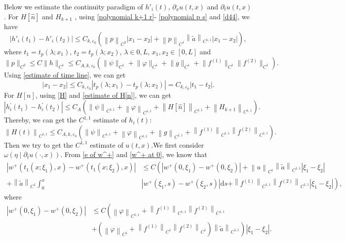 \documentclass[a4paper,reqno,11pt]{amsart}
\numberwithin{equation}{section} %
\begin{document}
Below we estimate the continuity paradigm of  $h'_i(t)$, $\partial _x u(t,x)$ and  $\partial _t u(t,x)$ .
For $ H\left[ \hat{n} \right] $ and $H_{k+1}$ , using \eqref{polynomial k+1 r}- \eqref{polynomial p s} and \eqref{d44}, we have
$$
\left| h' _i\left( t_1 \right) -h'_i\left( t_2 \right) \right|\leq C_{k,\varepsilon _0}(\left\| p \right\| _{C^2}\left| x_1-x_2 \right|+\left\| p \right\| _{C^1}\left\| \tilde{a} \right\| _{C^{1,1}}\left| x_1-x_2 \right|),
$$
where $t_1=t_p(\lambda ;x _1)$, $t_2=t_p(\lambda;x _2)$, $\lambda  \in { 0,L } $, $x _1,x _2 \in [0,L]$  and
$$
\|p\|_{C^2} \leq C\|h\|_{C^1} \leq C_{A,k,\varepsilon _0}(\lVert \psi \rVert _{C^1}+\lVert \varphi  \rVert _{C^1}+  \lVert g \rVert _{C^1}+\lVert f^{(1)} \rVert _{C^1}\lVert f^{(2)} \rVert _{C^1}) .
$$
Using \eqref{estimate of time line}, we can get
$$
\left| x_1-x_2 \right|\le C_{k,\varepsilon _0}\left| t_p\left( \lambda ;x_1 \right) -t_p\left( \lambda ;x_2 \right) \right|=C_{k,\varepsilon _0}\left| t_1-t_2 \right|.
$$
For $ H\left[ n \right] $, using \eqref{H} and \eqref{estimate of H[n]}, we can get
$$
\left| h^{\prime }_i\left( t_1 \right) -h^{\prime }_i\left( t_2 \right) \right|\leq C_A(\left\| \psi \right\| _{C^{1,1}}+\left\| \varphi \right\| _{C^{1,1}}+ \left\|H\left[ \hat{n} \right] \right\| _{C^{1,1}}+\left\|H_{k+1}\right\| _{C^{1,1}}).
$$
Thereby, we can get the $C^{1,1}$ estimate of $h_i(t) $:
$$
\left\| H(t) \right\| _{C^{1,1}}\leq C_{A,k,\varepsilon _0}(\left\| \psi \right\| _{C^{1,1}}+\left\| \varphi \right\| _{C^{1,1}}+\left\| g \right\| _{C^{1,1}}+\left\| f^{(1)} \right\| _{C^{1,1}}\left\| f^{(2)} \right\| _{C^{1,1}}).
$$
Then we try to get the $C^{1,1}$ estimate of $ u(t,x)$.We first consider $\omega \left( \eta \mid \partial _tu(\cdot ,x) \right) $.
From \eqref{e of w^+} and \eqref{w^+ at 0}, we know that
$$
\begin{aligned}
\left| w^+\left( t_1\left( x;\xi _1 \right) ,x \right) -w^+\left( t_1\left( x;\xi _2 \right) ,x \right) \right| & \leq C\left( \left| w^+\left( 0,\xi _1 \right) -w^+\left( 0,\xi _2 \right) \right|+\left\| u \right\| _{C^1}\left\| \tilde{a} \right\| _{C^{1,1}}\left| \xi _1-\xi _2 \right| \right. \\
+\left\| \tilde{a} \right\| _{C^1}\int_0^x & {\left| w^+\left( \xi _1,s \right) -w^+\left( \xi _2,s \right) \right|\mathrm{d}s}  \left. +\left\| f^{\left( 1 \right)} \right\| _{C^{1,1}}\left\| f^{\left( 2 \right)} \right\| _{C^{1,1}}\left| \xi _1-\xi _2 \right| \right) ,
\end{aligned}
$$
where
$$
\begin{aligned}
	\left| w^+\left( 0,\xi _1 \right) -w^+\left( 0,\xi _2 \right) \right|& \leq  C\left( \left\| \varphi \right\| _{C^{1,1}}+\left\| f^{(1)} \right\| _{C^{1,1}}\left\| f^{(2)} \right\| _{C^{1,1}} \right.\\
	& \left. +\left( \left\| \varphi \right\| _{C^1}+\left\| f^{(1)} \right\| _{C^1}\left\| f^{(2)} \right\| _{C^1} \right) \left\| \tilde{a} \right\| _{C^{1,1}} \right) \left| \xi _1-\xi _2 \right|.
\end{aligned}
$$
\end{document}
